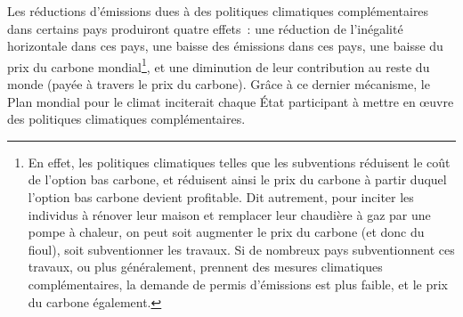 \documentclass[a5paper,french]{memoir}
\begin{document}
Les réductions d'émissions dues à des politiques climatiques complémentaires dans certains pays %
produiront quatre effets~: une réduction de l'inégalité horizontale dans ces pays, une baisse des émissions dans ces pays, une baisse du prix du carbone mondial\footnote{En effet, les politiques climatiques telles que les subventions réduisent le coût de l'option bas carbone, et réduisent ainsi le prix du carbone à partir duquel l'option bas carbone devient profitable. Dit autrement, pour inciter les individus à rénover leur maison et remplacer leur chaudière à gaz par une pompe à chaleur, on peut soit augmenter le prix du carbone (et donc du fioul), soit subventionner les travaux. Si de nombreux pays subventionnent ces travaux, ou plus généralement, prennent des mesures climatiques complémentaires, la demande de permis d'émissions est plus faible, et le prix du carbone également.}, et une diminution de leur contribution au reste du monde (payée à travers le prix du carbone). Grâce à ce dernier mécanisme, le Plan mondial pour le climat inciterait chaque État participant à mettre en œuvre des politiques climatiques complémentaires. 
\end{document}
